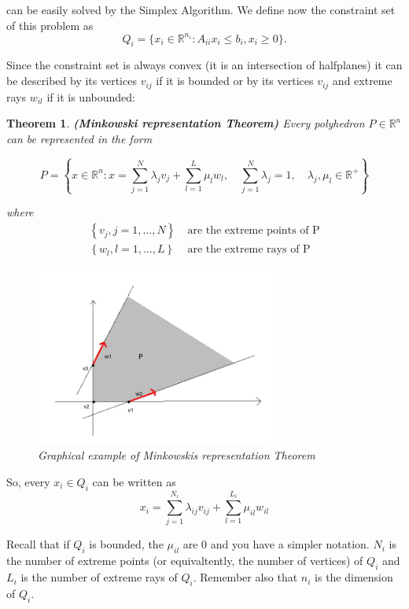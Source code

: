 \documentclass[a4paper,12pt]{article}
\newtheorem{Teo}{Theorem}
\begin{document}
can be easily solved by the Simplex Algorithm.
We define now the constraint set of this problem as 
\[
Q_i = \{x_i \in \mathbb{R}^{n_i}: A_{ii}x_i \leq b_i, x_i \geq 0\}.
\]

Since the constraint set is always convex (it is an intersection of halfplanes) it can be described by its vertices $v_{ij}$ if it is bounded or by its vertices $v_{ij}$ and extreme rays $w_{il}$ if it
is unbounded:

\begin{Teo}
\textbf{(Minkowski representation Theorem)}
Every polyhedron $P \in \mathbb{R}^n$ can be represented in the form

\[
P = \left\{ x \in \mathbb{R}^n : x = \sum_{j = 1}^N \lambda_j v_j + \sum_{l = 1}^L \mu_l w_l, \quad
\sum_{j = 1}^N \lambda_j = 1, \quad \lambda_j,\mu_l \in \mathbb{R}^+ \right\}
\]

where
\begin{align*}
\left\{v_j , j = 1,\dots, N\right\}& \; \text{are the extreme points of P} \\
\left\{w_l , l = 1,\dots, L\right\}& \; \text{are the extreme rays of P}
\end{align*}

\begin{figure}[htbp] 
  \centering
     \includegraphics[width=0.7\textwidth]{Minkowski.jpg}
  \caption{Graphical example of Minkowskis representation Theorem}
  \label{fig:Bild1}
\end{figure}
\end{Teo}

So, every $x_i \in Q_i$ can be written as 
\begin{equation}
\label{eq:xMinkowski}
x_i = \sum_{j = 1}^{N_i} \lambda_{ij}v_{ij} + \sum_{l = 1}^{L_i} \mu_{il}w_{il}
\end{equation}

Recall that if $Q_i$ is bounded, the $\mu_{il}$ are 0 and you have a simpler notation. $N_i$ is the number of extreme points (or equivaltently, the number of vertices) of $Q_i$ and $L_i$ is the number of extreme rays of $Q_i$. Remember also that $n_i$ is the dimension of $Q_i$.
\end{document}
